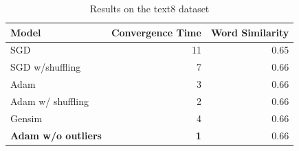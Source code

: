 \begin{table}[tb]
    \caption{Results on the text8 dataset}
    \begin{tabular}{l r r }
        \toprule
Model    & Convergence Time & Word Similarity \\ \hline
SGD & {11}              & 0.65            \\ 
SGD w/shuffling & {7}              & 0.66            \\ 
Adam & {3}              & 0.66            \\ 
Adam w/ shuffling & {2}              & 0.66      \\ 
Gensim   & 4          & 0.66            \\ \hline
\textbf{Adam w/o outliers }& \textbf{1} & 0.66 \\  \hline
\bottomrule
\end{tabular}\label{table:results_text8}
\end{table}